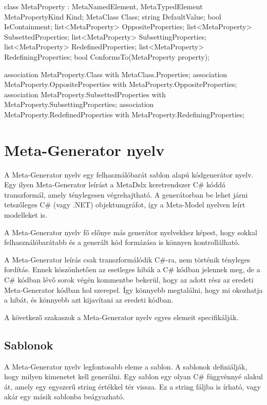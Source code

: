 \documentclass[12pt, a4paper]{report}
\begin{document}
\begin{mmcode}
{	class MetaProperty : MetaNamedElement, MetaTypedElement
	{
		MetaPropertyKind Kind;
		MetaClass Class;
		string DefaultValue;
		bool IsContainment;
		list<MetaProperty> OppositeProperties;
		list<MetaProperty> SubsettedProperties;
		list<MetaProperty> SubsettingProperties;
		list<MetaProperty> RedefinedProperties;
		list<MetaProperty> RedefiningProperties;
		bool ConformsTo(MetaProperty property);
	}
	
	association MetaProperty.Class with MetaClass.Properties;
	association MetaProperty.OppositeProperties with MetaProperty.OppositeProperties;
	association MetaProperty.SubsettedProperties with MetaProperty.SubsettingProperties;
	association MetaProperty.RedefinedProperties with MetaProperty.RedefiningProperties;
}
\end{mmcode}

\chapter{Meta-Generator nyelv}

A Meta-Generator nyelv egy felhasználóbarát sablon alapú kódgenerátor nyelv. Egy ilyen Meta-Generator leírást a MetaDslx keretrendszer C\# kóddá transzformál, amely ténylegesen végrehajtható. A generátorban be lehet járni tetszőleges C\# (vagy .NET) objektumgráfot, így a Meta-Model nyelven leírt modelleket is.

A Meta-Generator nyelv fő előnye más generátor nyelvekhez képest, hogy sokkal felhasználóbarátabb és a generált kód formázása is könnyen kontrollálható.

A Meta-Generator leírás csak transzformálódik C\#-ra, nem történik tényleges fordítás. Ennek köszönhetően az esetleges hibák a C\# kódban jelennek meg, de a C\# kódban lévő sorok végén kommentbe bekerül, hogy az adott rész az eredeti Meta-Generator kódban hol szerepel. Így könnyebb megtalálni, hogy mi okozhatja a hibát, és könnyebb azt kijavítani az eredeti kódban.

A következő szakaszok a Meta-Generator nyelv egyes elemeit specifikálják.

\section{Sablonok}

A Meta-Generator nyelv legfontosabb eleme a sablon. A sablonok definiálják, hogy milyen kimenetet kell generálni. Egy sablon egy olyan C\# függvénnyé alakul át, amely egy egyszerű string értékkel tér vissza. Ez a string fáljba is írható, vagy akár egy másik sablonba beágyazható.
\end{document}
